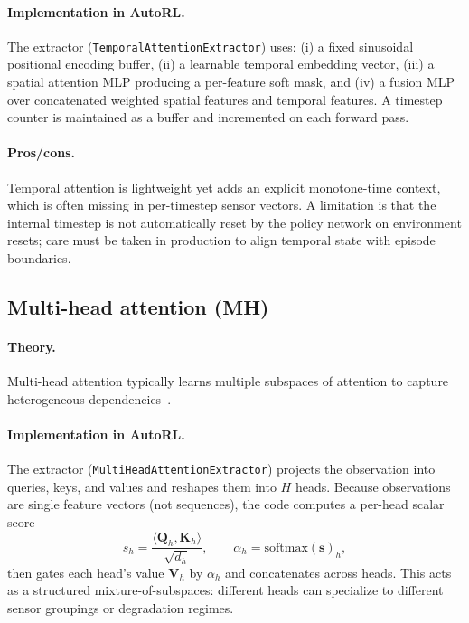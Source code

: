 \documentclass[11pt]{article}
\begin{document}
\paragraph{Implementation in AutoRL.}
The extractor (\texttt{TemporalAttentionExtractor}) uses: (i) a fixed sinusoidal positional encoding buffer, (ii) a learnable temporal embedding vector, (iii) a spatial attention MLP producing a per-feature soft mask, and (iv) a fusion MLP over concatenated weighted spatial features and temporal features. A timestep counter is maintained as a buffer and incremented on each forward pass.

\paragraph{Pros/cons.}
Temporal attention is lightweight yet adds an explicit monotone-time context, which is often missing in per-timestep sensor vectors. A limitation is that the internal timestep is not automatically reset by the policy network on environment resets; care must be taken in production to align temporal state with episode boundaries.

\subsection{Multi-head attention (MH)}
\paragraph{Theory.}
Multi-head attention typically learns multiple subspaces of attention to capture heterogeneous dependencies~\cite{Vaswani2017Attention}.

\paragraph{Implementation in AutoRL.}
The extractor (\texttt{MultiHeadAttentionExtractor}) projects the observation into queries, keys, and values and reshapes them into $H$ heads. Because observations are single feature vectors (not sequences), the code computes a per-head scalar score
\begin{equation}
  s_h = \frac{\langle \mathbf{Q}_h, \mathbf{K}_h\rangle}{\sqrt{d_h}},\qquad
  \alpha_h = \mathrm{softmax}(\mathbf{s})_h,
\end{equation}
then gates each head's value $\mathbf{V}_h$ by $\alpha_h$ and concatenates across heads. This acts as a structured mixture-of-subspaces: different heads can specialize to different sensor groupings or degradation regimes.
\end{document}
